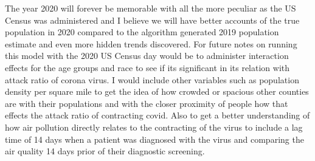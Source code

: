 \documentclass[
]{article}
\begin{document}
The year 2020 will forever be memorable with all the more peculiar as
the US Census was administered and I believe we will have better
accounts of the true population in 2020 compared to the algorithm
generated 2019 population estimate and even more hidden trends
discovered. For future notes on running this model with the 2020 US
Census day would be to administer interaction effects for the age groups
and race to see if its significant in its relation with attack ratio of
corona virus. I would include other variables such as population density
per square mile to get the idea of how crowded or spacious other
counties are with their populations and with the closer proximity of
people how that effects the attack ratio of contracting covid. Also to
get a better understanding of how air pollution directly relates to the
contracting of the virus to include a lag time of 14 days when a patient
was diagnosed with the virus and comparing the air quality 14 days prior
of their diagnostic screening.
\end{document}
